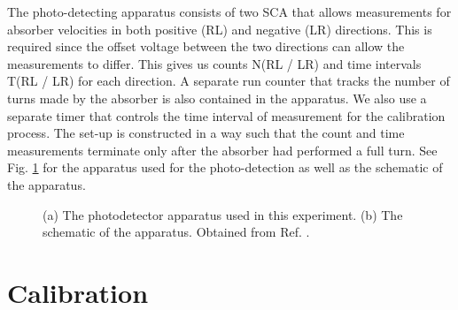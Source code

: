 \documentclass[a4paper]{report}
\numberwithin{equation}{section}
\begin{document}
The photo-detecting apparatus consists of two SCA that allows measurements for absorber velocities in both positive (RL) and negative (LR)
directions. This is required since the offset voltage between the two directions can allow the measurements to differ. This gives us 
counts N(RL / LR) and time intervals T(RL / LR) for each direction. A separate run counter that tracks the number of turns made by the absorber is also contained in the apparatus. We also use a separate timer that controls the time interval of measurement for the calibration process. The set-up is 
constructed in a way such that the count and time measurements terminate only after the absorber had performed a full turn. 
See Fig. \ref{fig:apparatus_raw} for the apparatus used for the photo-detection as well as the schematic of the apparatus. \par 

\begin{figure}[htb!]
	\centering
	\quad
	\centering
	\caption{(a) The photodetector apparatus used in this experiment. (b) The schematic of the apparatus. Obtained from 
			Ref. \cite{k2212016}.}
	\label{fig:apparatus_raw}
\end{figure}


\chapter{Calibration} \label{sec:calibration}
\end{document}
